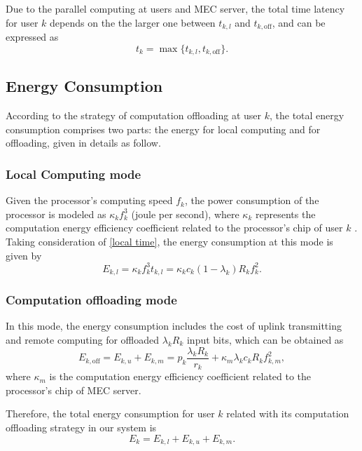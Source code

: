 \documentclass[journal]{IEEEtran}
\begin{document}
    Due to the parallel computing at users and MEC server, the total time latency for user $k$ depends on the the larger one between $t_{k,l}$ and $t_{k,\text{off}}$, and can be expressed as
    \begin{equation}
        t_k = \max \{t_{k,l}, t_{k,\text{off}}\}.
    \end{equation}
    \subsection{Energy Consumption}
    According to the strategy of computation offloading at user $k$, the total energy consumption comprises two parts: the energy for local computing and for offloading, given in details as follow.
    \subsubsection{Local Computing mode}
    Given the processor's computing speed $f_k$, the power consumption of the processor is modeled as $\kappa_kf_k^3$ (joule per second), where $\kappa_k$ represents the computation energy efficiency coefficient related to the processor's chip of user $k$ \cite{Zhang2013Energy,Wang2016Mobile,Bi2018Computation}. Taking consideration of \eqref{local time}, the energy consumption at this mode is given by
    \begin{equation}
        E_{k,l}=\kappa_kf_k^3t_{k,l}=\kappa_kc_k\left(1-\lambda_k\right) R_kf_k^2.
    \end{equation}
    \subsubsection{Computation offloading mode}
    In this mode, the energy consumption includes the cost of uplink transmitting and remote computing for offloaded $\lambda_kR_k$ input bits, which can be obtained as
    \begin{equation}
        \label{e_u,m}
        E_{k,\text{off}}=E_{k,u}+E_{k,m}= p_{k}\frac{\lambda_kR_k}{r_k}+\kappa_m\lambda_kc_kR_kf_{k,m}^2,
    \end{equation}
    where $\kappa_m$ is the computation energy efficiency coefficient related to the processor's chip of MEC server.

    Therefore, the total energy consumption for user $k$ related with its computation offloading strategy in our system is
    \begin{equation}
        E_k = E_{k,l}+E_{k,u}+E_{k,m}.
    \end{equation}
\end{document}
